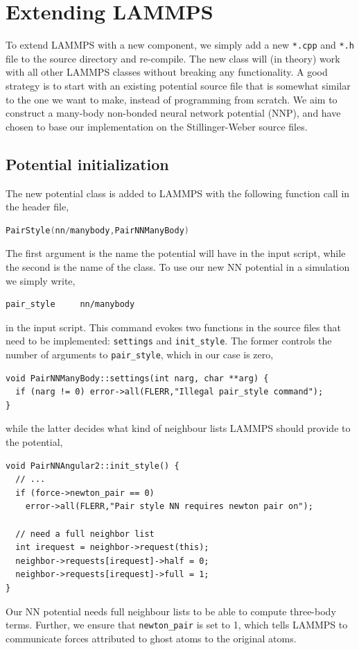 \documentclass[twoside,english]{uiofysmaster}
\begin{document}
\section{Extending LAMMPS} \label{sec:extendingLammps}
To extend LAMMPS with a new component, we 
simply add a new \texttt{*.cpp} and \texttt{*.h} file to the 
source directory and re-compile. The new class
will (in theory) work with all other LAMMPS 
classes without breaking any functionality. 
A good strategy is to start with an existing potential
source file that is somewhat similar to the one 
we want to make, instead of programming from scratch.
We aim to construct a many-body non-bonded neural network potential (NNP), and 
have chosen to base our implementation on the 
Stillinger-Weber source files.

\subsection{Potential initialization}
The new potential class is added to LAMMPS with the following function call in the header file,
\begin{lstlisting}[language=c++]
 PairStyle(nn/manybody,PairNNManyBody)
\end{lstlisting}
The first argument is the name the potential will have in the input script, while 
the second is the name of the class. 
To use our new NN potential in a simulation we simply write,
\begin{lstlisting}[style=lammps]
 pair_style 	nn/manybody
\end{lstlisting}
in the input script. This command evokes two functions in the source files that need to be implemented: \texttt{settings}
and \texttt{init\_style}. The former controls the number of arguments to 
\texttt{pair\_style}, which in our case is zero, 
\begin{verbatim}
void PairNNManyBody::settings(int narg, char **arg) {
  if (narg != 0) error->all(FLERR,"Illegal pair_style command");
}
\end{verbatim}
while the latter decides what kind of neighbour lists LAMMPS should provide to the potential, 
\begin{verbatim}
void PairNNAngular2::init_style() {
  // ... 
  if (force->newton_pair == 0)
    error->all(FLERR,"Pair style NN requires newton pair on");

  // need a full neighbor list
  int irequest = neighbor->request(this);
  neighbor->requests[irequest]->half = 0;
  neighbor->requests[irequest]->full = 1;
}
\end{verbatim}
Our NN potential needs full neighbour lists to be able to compute three-body terms. Further, 
we ensure that \texttt{newton\_pair} is set to 1, which tells LAMMPS to communicate forces attributed to ghost 
atoms to the original atoms. 
\end{document}
